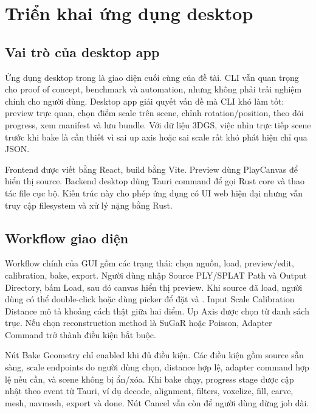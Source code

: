 \section{Triển khai ứng dụng desktop}

\subsection{Vai trò của desktop app}

Ứng dụng desktop trong  là giao diện cuối cùng của đề tài. CLI vẫn quan trọng cho proof of concept, benchmark và automation, nhưng không phải trải nghiệm chính cho người dùng. Desktop app giải quyết vấn đề mà CLI khó làm tốt: preview trực quan, chọn điểm scale trên scene, chỉnh rotation/position, theo dõi progress, xem manifest và lưu bundle. Với dữ liệu 3DGS, việc nhìn trực tiếp scene trước khi bake là cần thiết vì sai up axis hoặc sai scale rất khó phát hiện chỉ qua JSON.

Frontend được viết bằng React, build bằng Vite. Preview dùng PlayCanvas để hiển thị source. Backend desktop dùng Tauri command để gọi Rust core và thao tác file cục bộ. Kiến trúc này cho phép ứng dụng có UI web hiện đại nhưng vẫn truy cập filesystem và xử lý nặng bằng Rust.

\subsection{Workflow giao diện}

Workflow chính của GUI gồm các trạng thái: chọn nguồn, load, preview/edit, calibration, bake, export. Người dùng nhập Source PLY/SPLAT Path và Output Directory, bấm Load, sau đó canvas hiển thị preview. Khi source đã load, người dùng có thể double-click hoặc dùng picker để đặt  và . Input Scale Calibration Distance mô tả khoảng cách thật giữa hai điểm. Up Axis được chọn từ danh sách trục. Nếu chọn reconstruction method là SuGaR hoặc Poisson, Adapter Command trở thành điều kiện bắt buộc.

Nút Bake Geometry chỉ enabled khi đủ điều kiện. Các điều kiện gồm source sẵn sàng, scale endpoints do người dùng chọn, distance hợp lệ, adapter command hợp lệ nếu cần, và scene không bị ẩn/xóa. Khi bake chạy, progress stage được cập nhật theo event từ Tauri, ví dụ decode, alignment, filters, voxelize, fill, carve, mesh, navmesh, export và done. Nút Cancel vẫn còn để người dùng dừng job dài.

